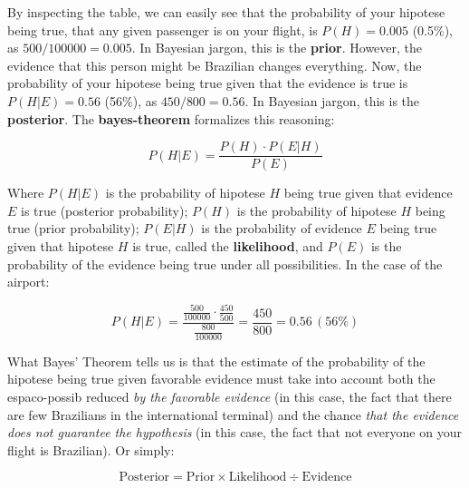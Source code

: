 \documentclass[./main_en.tex]{subfiles}
\begin{document}
By inspecting the table, we can easily see that the probability of your \gls{hipotese} being true, that any given passenger is on your flight, is $P(H) = 0.005$ (0.5\%), as $500 / 100000 = 0.005$. In Bayesian jargon, this is the \textbf{\gls{prior}}. However, the evidence that this person might be Brazilian changes everything. Now, the probability of your \gls{hipotese} being true given that the evidence is true is $P(H | E) = 0.56$ (56\%), as $450 / 800 = 0.56$. In Bayesian jargon, this is the \textbf{\gls{posterior}}. The \textbf{\gls{bayes-theorem}} formalizes this reasoning:
\begin{linenomath*}
\begin{equation}
\label{eq:bayes}
    P(H | E) = \frac{P(H) \cdot P(E | H)}{P(E)}
\end{equation}
\end{linenomath*}
Where $P(H | E)$ is the probability of \gls{hipotese} $H$ being true given that evidence $E$ is true (posterior probability); $P(H)$ is the probability of \gls{hipotese} $H$ being true (prior probability); $P(E | H)$ is the probability of evidence $E$ being true given that \gls{hipotese} $H$ is true, called the \textbf{\gls{likelihood}}, and $P(E)$ is the probability of the evidence being true under all possibilities. In the case of the airport:
\begin{linenomath*}
\begin{equation*}
    P(H | E) = \frac{\frac{500}{100000} \cdot \frac{450}{500}}{\frac{800}{100000}} = \frac{450}{800} = 0.56\,(56\%)
\end{equation*}
\end{linenomath*}
What Bayes' Theorem tells us is that the estimate of the probability of the \gls{hipotese} being true given favorable evidence must take into account both the \gls{espaco-possib} reduced \textit{by the favorable evidence} (in this case, the fact that there are few Brazilians in the international terminal) and the chance \textit{that the evidence does not guarantee the hypothesis} (in this case, the fact that not everyone on your flight is Brazilian). Or simply:
\begin{linenomath*}
\begin{equation*}
    \text{Posterior} = \text{Prior} \times \text{Likelihood} \div \text{Evidence}
\end{equation*}
\end{linenomath*}
\end{document}
